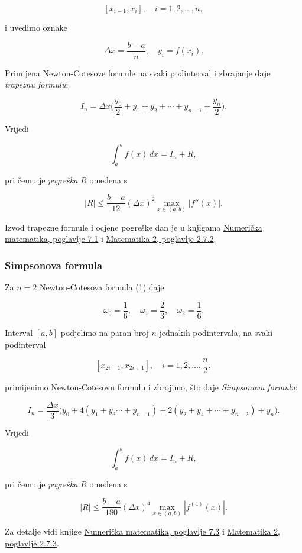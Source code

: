 \documentclass[11pt]{article}
\begin{document}
\[[x_{i-1},x_{i}],\quad  i=1,2,\ldots,n,\]

i uvedimo oznake

\[ 
\Delta x=\frac{b-a}{n}, \quad y_i=f(x_i).
\]

Primijena Newton-Cotesove formule na svaki podinterval i zbrajanje daje
\emph{trapeznu formulu}:

\[
I_n=\Delta x\bigg( \frac{y_0}{2} +y_1+y_2+\cdots +y_{n-1}+\frac{y_n}{2}\bigg).
\]

Vrijedi

\[
\int_a^b f(x)\, dx=I_n+R,
\]

pri čemu je \emph{pogreška} \(R\) omeđena s

\[
|R|\leq \frac{b-a}{12}(\Delta x)^2 \max_{x\in(a,b)} |f''(x)|.
\]

Izvod trapezne formule i ocjene pogreške dan je u knjigama
\href{http://www.mathos.unios.hr/pim/Materijali/Num.pdf}{Numerička
matematika, poglavlje 7.1} i
\href{http://lavica.fesb.hr/mat2/predavanja/node46.html}{Matematika 2,
poglavlje 2.7.2}.

\hypertarget{simpsonova-formula}{%
\subsubsection{Simpsonova formula}\label{simpsonova-formula}}

Za \(n=2\) Newton-Cotesova formula (1) daje

\[\omega_0=\frac{1}{6},\quad \omega_1=\frac{2}{3},\quad \omega_2=\frac{1}{6}.\]

Interval \([a,b]\) podjelimo na paran broj \(n\) jednakih podintervala,
na svaki podinterval

\[[x_{2i-1},x_{2i+1}],\quad i=1,2,\ldots,\frac{n}{2},\]

primijenimo Newton-Cotesovu formulu i zbrojimo, što daje
\emph{Simpsonovu formulu}:

\[
I_n=\frac{\Delta x}{3}\big(y_0 +4(y_1+y_3\cdots +y_{n-1})+2(y_2+y_4+\cdots+y_{n-2})+y_n\big).
\]

Vrijedi

\[
\int_a^b f(x)\, dx =I_n+R,
\]

pri čemu je \emph{pogreška} \(R\) omeđena s

\[
|R|\leq \frac{b-a}{180}(\Delta x)^4 \max_{x\in(a,b)} |f^{(4)}(x)|. \tag{2}
\]

Za detalje vidi knjige
\href{http://www.mathos.unios.hr/pim/Materijali/Num.pdf}{Numerička
matematika, poglavlje 7.3} i
\href{http://lavica.fesb.hr/mat2/predavanja/node46.html}{Matematika 2,
poglavlje 2.7.3}.
\end{document}
